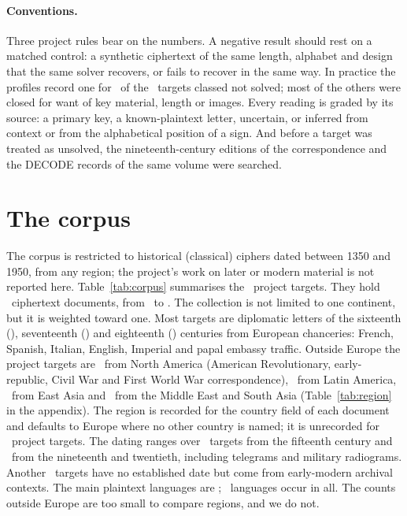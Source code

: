 \documentclass[11pt]{article}
\begin{document}
\paragraph{Conventions.} Three project rules bear on the numbers. A negative result should rest on a matched control: a synthetic ciphertext of the same length, alphabet and design that the same solver recovers, or fails to recover in the same way. In practice the profiles record one for \NnotControl\ of the \NNS\ targets classed not solved; most of the others were closed for want of key material, length or images. Every reading is graded by its source: a primary key, a known-plaintext letter, uncertain, or inferred from context or from the alphabetical position of a sign. And before a target was treated as unsolved, the nineteenth-century editions of the correspondence and the DECODE records of the same volume were searched.

\section{The corpus}
\label{sec:corpus}



The corpus is restricted to historical (classical) ciphers dated between 1350 and 1950, from any region; the project's work on later or modern material is not reported here. Table~\ref{tab:corpus} summarises the \Ntargets\ project targets. They hold \Ndocs\ ciphertext documents, from \YearMin\ to \YearMax. The collection is not limited to one continent, but it is weighted toward one. Most targets are diplomatic letters of the sixteenth (\NsixteenthC), seventeenth (\NseventeenthC) and eighteenth (\NeighteenthC) centuries from European chanceries: French, Spanish, Italian, English, Imperial and papal embassy traffic. Outside Europe the project targets are \NRNA\ from North America (American Revolutionary, early-republic, Civil War and First World War correspondence), \NRLA\ from Latin America, \NREA\ from East Asia and \NRME\ from the Middle East and South Asia (Table~\ref{tab:region} in the appendix). The region is recorded for the country field of each document and defaults to Europe where no other country is named; it is unrecorded for \NregionUnknown\ project targets. The dating ranges over \NfifteenthC\ targets from the fifteenth century and \NmodernC\ from the nineteenth and twentieth, including telegrams and military radiograms. Another \Nundated\ targets have no established date but come from early-modern archival contexts. The main plaintext languages are \TopLanguages; \Nlanguages\ languages occur in all. The counts outside Europe are too small to compare regions, and we do not.
\end{document}
